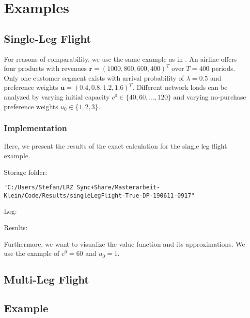 \chapter{Examples}\label{ch:Examples}

\section{Single-Leg Flight}

For reasons of comparability, we use the same example as in \cite{Koch.2017}. An airline offers four products with revenues $\boldsymbol{r} = (1000, 800, 600, 400)^T$ over $T = 400$ periods. Only one customer segment exists with arrival probability of $\lambda = 0.5$ and preference weights $\boldsymbol{u} = (0.4, 0.8, 1.2, 1.6)^T$. Different network loads can be analyzed by varying initial capacity $c^0 \in \{40, 60, \dots, 120\}$ and varying no-purchase preference weights $u_0 \in \{1,2,3\}$.

\subsection{Implementation}

Here, we present the results of the exact calculation for the single leg flight example.

Storage folder: 

\texttt{"C:/Users/Stefan/LRZ Sync+Share/Masterarbeit-Klein/Code/Results/singleLegFlight-True-DP-190611-0917"}

Log:



Results:



Furthermore, we want to visualize the value function and its approximations. We use the example of $c^0 = 60$ and $u_0 = 1$. 

\section{Multi-Leg Flight}

\section{Example \cite{Bront.2009}}

